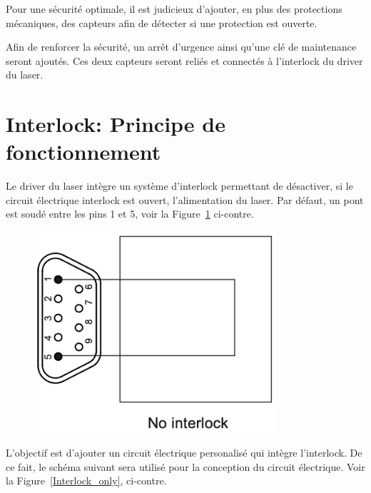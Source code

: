 Pour une sécurité optimale, il est judicieux d'ajouter, en plus des protections mécaniques, des capteurs afin de détecter si une protection est ouverte.

Afin de renforcer la sécurité, un arrêt d'urgence ainsi qu'une clé de maintenance seront ajoutés. Ces deux capteurs seront reliés et connectés à l'interlock du driver du laser.

\section{Interlock: Principe de fonctionnement}

\begin{minipage}[c]{0.6\textwidth}
    Le driver du laser intègre un système d'interlock permettant de désactiver, si le circuit électrique interlock est ouvert, l'alimentation du laser. Par défaut, un pont est soudé entre les pins 1 et 5, voir la Figure~\ref{No_interlock} ci-contre.
\end{minipage}\hfill
\begin{minipage}[c]{0.35\textwidth}
    \begin{figure}[H]
        \begin{center}
            \includegraphics[width=0.8\textwidth]{assets/figures/Protections_laser/Securite_electrique/no_interlock.png}
        \end{center}
        \label{No_interlock}
    \end{figure}
\end{minipage}
\begin{minipage}[c]{0.6\textwidth}
    L'objectif est d'ajouter un circuit électrique personalisé qui intègre l'interlock. De ce fait, le schéma suivant sera utilisé pour la conception du circuit électrique. Voir la Figure~\ref{Interlock_only}, ci-contre.
\end{minipage}\hfill
